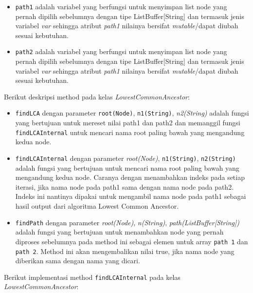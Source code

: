 \begin{itemize}

\item \texttt{path1} adalah variabel yang berfungsi untuk menyimpan list node yang pernah dipilih sebelumnya dengan tipe ListBuffer[String] dan termasuk jenis variabel \textit{var} sehingga atribut \textit{path1} nilainya bersifat \textit{mutable}/dapat diubah sesuai kebutuhan.

\item \texttt{path2} adalah variabel yang berfungsi untuk menyimpan list node yang pernah dipilih sebelumnya dengan tipe ListBuffer[String] dan termasuk jenis variabel \textit{var} sehingga atribut \textit{path1} nilainya bersifat \textit{mutable}/dapat diubah sesuai kebutuhan.

\end{itemize}

\noindent Berikut deskripsi method pada kelas \textit{LowestCommonAncestor}:

\begin{itemize}

\item \texttt{findLCA} dengan parameter \texttt{root(Node)}, \texttt{n1(String)}, \textit{n2(String)} adalah fungsi yang bertujuan untuk mereset nilai path1 dan path2 dan memanggil fungsi \texttt{findLCAInternal} untuk mencari nama root paling bawah yang mengandung kedua node.

\item \texttt{findLCAInternal} dengan parameter \textit{root(Node)}, \texttt{n1(String)}, \texttt{n2(String)} adalah fungsi yang bertujuan untuk mencari nama root paling bawah yang mengandung kedua node. Caranya dengan menambahkan indeks pada setiap iterasi, jika nama node pada path1 sama dengan nama node pada path2. Indeks ini nantinya dipakai untuk mengambil nama node pada path1 sebagai hasil output dari algoritma Lowest Common Ancestor.

\item \texttt{findPath} dengan parameter \textit{root(Node)}, \textit{n(String)}, \textit{path(ListBuffer[String])} adalah fungsi yang bertujuan untuk menambahkan node yang pernah diproses sebelumnya pada method ini sebagai elemen untuk array \texttt{path 1} dan \texttt{path 2}. Method ini akan mengembalikan nilai true, jika nama node yang diberikan sama dengan nama yang dicari.

\end{itemize}

\noindent Berikut implementasi method \texttt{findLCAInternal} pada kelas \textit{LowestCommonAncestor}:

